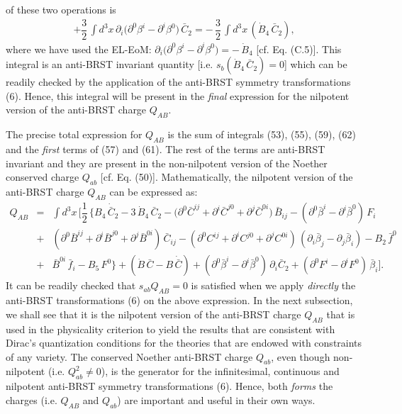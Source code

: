 \documentclass[12pt]{article}
\begin{document}
of these two operations is
\begin{eqnarray}\label{62}
+ \dfrac{3}{2}\,
\int d^3 x\,\partial_i \big (\partial^0 \beta^i - \partial^i \beta^0\big )\, \bar C_2 = -\, \dfrac{3}{2}\,\int d^3 x\, (\dot B_4\, \bar C_2),
\end{eqnarray}
where we have used the EL-EoM: $ \partial_i \big (\partial^0 \beta^i - \partial^i \beta^0\big ) = -\, \dot B_4$ [cf. Eq. (C.5)]. This
integral is an anti-BRST invariant quantity [i.e. $s_b (\dot B_4\, \bar C_2) = 0 $]
which can be readily checked by the application of the anti-BRST symmetry transformations (6). Hence,
this integral will be present in the {\it final} expression for the nilpotent version of the anti-BRST charge $Q_{AB}$.



The precise total  expression for $Q_{AB}$ is the sum of integrals (53), (55), (59), (62) and the {\it first} terms of (57) and (61). The rest of the
terms are anti-BRST invariant and they are present in the non-nilpotent version of the Noether conserved charge $Q_{ab}$ [cf. Eq. (50)]. 
Mathematically, the nilpotent version of the anti-BRST charge $Q_{AB}$ can be expressed as:
 \begin{eqnarray}\label{63}
Q_{AB}  &=&   \int d^3 x\, \Big [ \dfrac{1}{2}\, \Big \{B_4 \, \dot {\bar C}_2 -  3 \, \dot B_4\, \bar C_2 
-  \big (\partial^0 \bar C^{ij} + \partial^i \bar C^{j0} + \partial^j \bar C^{0i} \big )\, \bar B_{ij} 
- (\partial^0 \bar \beta^i - \partial^i \bar \beta^0)\,  F_i  \nonumber\\
&+& (\partial^0  \bar B^{ij} + \partial^i \bar B^{j0} + \partial^j \bar B^{0i})\, \bar C_{ij} 
- (\partial^0  C^{ij} + \partial^i  C^{j0} + \partial^j C^{0i})\,(\partial_i \bar \beta_j - \partial_j \bar \beta_i) - B_2 \, \bar f^0 \nonumber\\
&+& \bar B^{0i}\,\bar f_i  - B_5\,  F^0 \Big \} 
+  (\dot B \, \bar C - B \, \dot {\bar C}) +  (\partial^0 \bar \beta^i - \partial^i \bar \beta^0) \, \partial_i \bar C_2
+ (\partial^0 F^i - \partial^i F^0)\, \bar \beta_i \Big ].
\end{eqnarray}
It can be readily checked that $s_{ab} Q_{AB} = 0$ is satisfied when we apply {\it directly} the anti-BRST transformations (6) on the
above expression. In the next subsection, we shall see that it is the nilpotent version of the anti-BRST charge $Q_{AB}$ that is
used in the physicality criterion to yield the results that are consistent with Dirac's quantization conditions for the theories
that are endowed with  constraints of any variety. The conserved Noether anti-BRST charge $Q_{ab}$, even though non-nilpotent
(i.e. $Q_{ab}^2 \neq 0 $), is the generator for the infinitesimal, continuous and nilpotent anti-BRST symmetry transformations (6). Hence,
both {\it forms} the charges (i.e. $Q_{AB}$ and $Q_{ab}$) are important and useful in their own ways.\\
\end{document}

